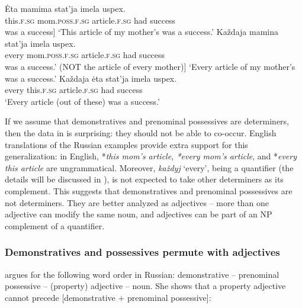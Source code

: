\documentclass[output=paper,
colorlinks,
citecolor=brown,
newtxmath
]{langscibook}
\begin{document}
\ea\label{statja}
\ea\label{etastatja}
    \gll Ėta mamima stat'ja imela uspex.\\
    this.\textsc{f.sg} mom.\textsc{poss.f.sg} article.\textsc{f.sg} had success\\
    \glt [Literally: This [mom's article] was a success]
    \glt `This article of my mother's was a success.'
\ex\label{kazdajastatja}
    \gll Každaja mamina stat'ja imela uspex.\\
    every mom.\textsc{poss.f.sg} article.\textsc{f.sg} had success\\
    \glt [Literally: every [mom’s-article] was a success.' (NOT the article of every mother)]
    \glt `Every article of my mother's was a success.' 
\ex\label{kazdajaeta}
    \gll Každaja ėta stat'ja imela uspex.\\
    every this.\textsc{f.sg} article.\textsc{f.sg} had success\\
    \glt `Every article (out of these) was a success.'
\z\z

\noindent If we assume that demonstratives and prenominal possessives are determiners, then the data in  is surprising: they should not be able to co-occur. English translations of the Russian examples provide extra support for this generalization: in English, *\textit{this mom's article, *every mom's article}, and *\textit{every this article} are ungrammatical. Moreover, \textit{každyj} `every', being a quantifier (the details will be discussed in ), is not expected to take other determiners as its complement. This suggests that demonstratives and prenominal possessives are not determiners. They are better analyzed as adjectives -- more than one adjective can modify the same noun, and adjectives can be part of an NP complement of a quantifier. 


\subsubsection{Demonstratives and possessives permute with adjectives}

\citet{Pereltsvaig2007} %
argues for the following word order in Russian: demonstrative -- prenominal possessive -- (property) adjective -- noun. She shows that a property adjective cannot precede [demonstrative $+$ prenominal possessive]:


\ea\label{Vanja}
\z\z
\end{document}
